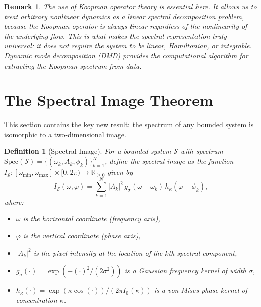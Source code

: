 \documentclass[11pt,twocolumn,a4paper]{article}
\newtheorem{definition}[theorem]{Definition}
\newtheorem{remark}[theorem]{Remark}
\newcommand{\R}{\mathbb{R}}
\newcommand{\Spec}{\mathrm{Spec}}
\begin{document}
\begin{remark}
The use of Koopman operator theory is essential here. It allows us to
treat \emph{arbitrary} nonlinear dynamics as a linear spectral
decomposition problem, because the Koopman operator is always linear
regardless of the nonlinearity of the underlying flow. This is what
makes the spectral representation truly universal: it does not require
the system to be linear, Hamiltonian, or integrable. Dynamic mode
decomposition (DMD) \citep{schmid2010} provides the computational
algorithm for extracting the Koopman spectrum from data.
\end{remark}


\section{The Spectral Image Theorem}
\label{sec:spectral_image_theorem}

This section contains the key new result: the spectrum of any bounded
system is isomorphic to a two-dimensional image.

\begin{definition}[Spectral Image]
\label{def:spectral_image}
For a bounded system $\mathcal{S}$ with spectrum
$\Spec(\mathcal{S}) = \{(\omega_k, A_k, \phi_k)\}_{k=1}^{N}$,
define the \emph{spectral image} as the function
$I_{\mathcal{S}}: [\omega_{\min}, \omega_{\max}] \times [0, 2\pi) \to \R_{\geq 0}$
given by
\begin{equation}
\label{eq:spectral_image}
  I_{\mathcal{S}}(\omega, \varphi) = \sum_{k=1}^{N} |A_k|^2 \,
    g_{\sigma}(\omega - \omega_k) \, h_{\kappa}(\varphi - \phi_k),
\end{equation}
where:
\begin{itemize}[nosep]
  \item $\omega$ is the horizontal coordinate (frequency axis),
  \item $\varphi$ is the vertical coordinate (phase axis),
  \item $|A_k|^2$ is the pixel intensity at the location of the $k$th
    spectral component,
  \item $g_{\sigma}(\cdot) = \exp(-(\cdot)^2 / (2\sigma^2))$ is a
    Gaussian frequency kernel of width $\sigma$,
  \item $h_{\kappa}(\cdot) = \exp(\kappa \cos(\cdot)) / (2\pi I_0(\kappa))$
    is a von Mises phase kernel of concentration $\kappa$.
\end{itemize}
\end{definition}
\end{document}
